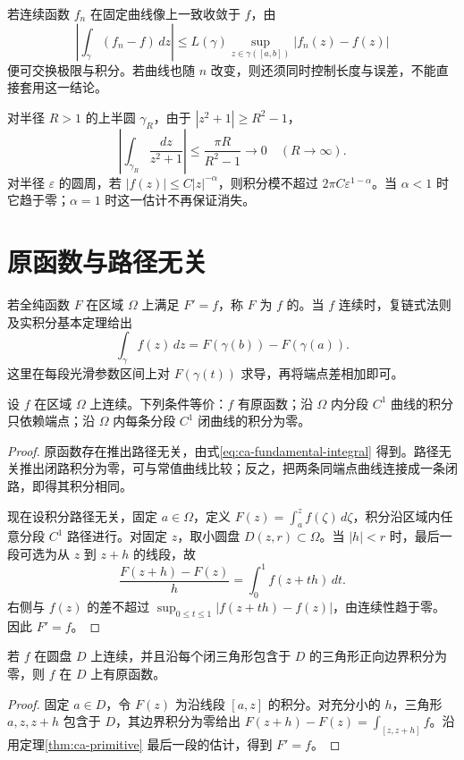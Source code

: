 \documentclass[UTF8,12pt,a4paper,fontset=fandol]{ctexbook}
\begin{document}
若连续函数 $f_n$ 在固定曲线像上一致收敛于 $f$，由
\[
 \left|\int_\gamma(f_n-f)\,dz\right|
 \le L(\gamma)\sup_{z\in\gamma([a,b])}|f_n(z)-f(z)|
\]
便可交换极限与积分。若曲线也随 $n$ 改变，则还须同时控制长度与误差，不能直接套用这一结论。

\begin{example}[圆弧上的量级]
对半径 $R>1$ 的上半圆 $\gamma_R$，由于 $|z^2+1|\ge R^2-1$，
\[
 \left|\int_{\gamma_R}\frac{dz}{z^2+1}\right|
 \le\frac{\pi R}{R^2-1}\longrightarrow0\quad(R\to\infty).
\]
对半径 $\varepsilon$ 的圆周，若 $|f(z)|\le C|z|^{-\alpha}$，则积分模不超过 $2\pi C\varepsilon^{1-\alpha}$。当 $\alpha<1$ 时它趋于零；$\alpha=1$ 时这一估计不再保证消失。
\end{example}

\section{原函数与路径无关}

若全纯函数 $F$ 在区域 $\Omega$ 上满足 $F'=f$，称 $F$ 为 $f$ 的。当 $f$ 连续时，复链式法则及实积分基本定理给出
\begin{equation}
 \int_\gamma f(z)\,dz=F(\gamma(b))-F(\gamma(a)).
 \label{eq:ca-fundamental-integral}
\end{equation}
这里在每段光滑参数区间上对 $F(\gamma(t))$ 求导，再将端点差相加即可。

\begin{theorem}[原函数判别]
\label{thm:ca-primitive}
设 $f$ 在区域 $\Omega$ 上连续。下列条件等价：$f$ 有原函数；沿 $\Omega$ 内分段 $C^1$ 曲线的积分只依赖端点；沿 $\Omega$ 内每条分段 $C^1$ 闭曲线的积分为零。
\end{theorem}
\begin{proof}
原函数存在推出路径无关，由式\eqref{eq:ca-fundamental-integral} 得到。路径无关推出闭路积分为零，可与常值曲线比较；反之，把两条同端点曲线连接成一条闭路，即得其积分相同。

现在设积分路径无关，固定 $a\in\Omega$，定义 $F(z)=\int_a^z f(\zeta)\,d\zeta$，积分沿区域内任意分段 $C^1$ 路径进行。对固定 $z$，取小圆盘 $D(z,r)\subset\Omega$。当 $|h|<r$ 时，最后一段可选为从 $z$ 到 $z+h$ 的线段，故
\[
 \frac{F(z+h)-F(z)}h=\int_0^1f(z+th)\,dt.
\]
右侧与 $f(z)$ 的差不超过 $\sup_{0\le t\le1}|f(z+th)-f(z)|$，由连续性趋于零。因此 $F'=f$。
\end{proof}

\begin{lemma}[圆盘上的三角形判别]
\label{lem:ca-triangle-primitive}
若 $f$ 在圆盘 $D$ 上连续，并且沿每个闭三角形包含于 $D$ 的三角形正向边界积分为零，则 $f$ 在 $D$ 上有原函数。
\end{lemma}
\begin{proof}
固定 $a\in D$，令 $F(z)$ 为沿线段 $[a,z]$ 的积分。对充分小的 $h$，三角形 $a,z,z+h$ 包含于 $D$，其边界积分为零给出 $F(z+h)-F(z)=\int_{[z,z+h]}f$。沿用定理\ref{thm:ca-primitive} 最后一段的估计，得到 $F'=f$。
\end{proof}
\end{document}

